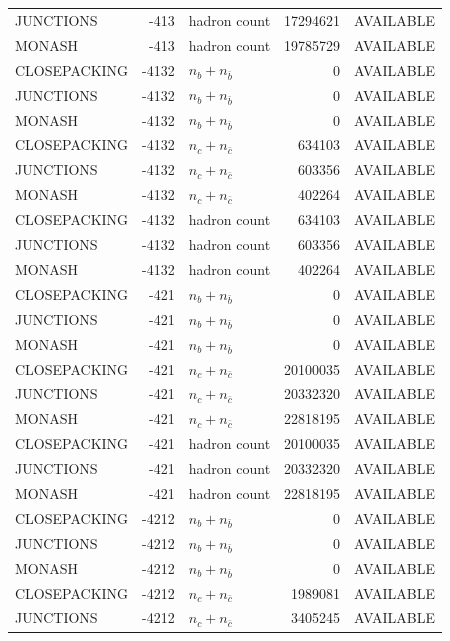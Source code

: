 \begin{landscape}
\begin{longtable}{@{}lrlrl@{}}
JUNCTIONS & -413 & hadron count & \num{17294621} & AVAILABLE \\
MONASH & -413 & hadron count & \num{19785729} & AVAILABLE \\
CLOSEPACKING & -4132 & $n_b+n_{\bar b}$ & \num{0} & AVAILABLE \\
JUNCTIONS & -4132 & $n_b+n_{\bar b}$ & \num{0} & AVAILABLE \\
MONASH & -4132 & $n_b+n_{\bar b}$ & \num{0} & AVAILABLE \\
CLOSEPACKING & -4132 & $n_c+n_{\bar c}$ & \num{634103} & AVAILABLE \\
JUNCTIONS & -4132 & $n_c+n_{\bar c}$ & \num{603356} & AVAILABLE \\
MONASH & -4132 & $n_c+n_{\bar c}$ & \num{402264} & AVAILABLE \\
CLOSEPACKING & -4132 & hadron count & \num{634103} & AVAILABLE \\
JUNCTIONS & -4132 & hadron count & \num{603356} & AVAILABLE \\
MONASH & -4132 & hadron count & \num{402264} & AVAILABLE \\
CLOSEPACKING & -421 & $n_b+n_{\bar b}$ & \num{0} & AVAILABLE \\
JUNCTIONS & -421 & $n_b+n_{\bar b}$ & \num{0} & AVAILABLE \\
MONASH & -421 & $n_b+n_{\bar b}$ & \num{0} & AVAILABLE \\
CLOSEPACKING & -421 & $n_c+n_{\bar c}$ & \num{20100035} & AVAILABLE \\
JUNCTIONS & -421 & $n_c+n_{\bar c}$ & \num{20332320} & AVAILABLE \\
MONASH & -421 & $n_c+n_{\bar c}$ & \num{22818195} & AVAILABLE \\
CLOSEPACKING & -421 & hadron count & \num{20100035} & AVAILABLE \\
JUNCTIONS & -421 & hadron count & \num{20332320} & AVAILABLE \\
MONASH & -421 & hadron count & \num{22818195} & AVAILABLE \\
CLOSEPACKING & -4212 & $n_b+n_{\bar b}$ & \num{0} & AVAILABLE \\
JUNCTIONS & -4212 & $n_b+n_{\bar b}$ & \num{0} & AVAILABLE \\
MONASH & -4212 & $n_b+n_{\bar b}$ & \num{0} & AVAILABLE \\
CLOSEPACKING & -4212 & $n_c+n_{\bar c}$ & \num{1989081} & AVAILABLE \\
JUNCTIONS & -4212 & $n_c+n_{\bar c}$ & \num{3405245} & AVAILABLE \\

\end{longtable}
\end{landscape}
